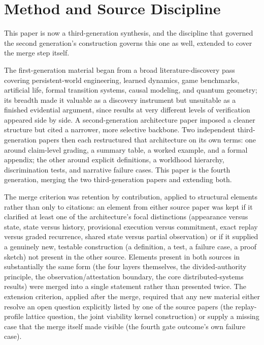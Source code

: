 \documentclass[11pt]{article}
\begin{document}
\section{Method and Source Discipline}
\label{sec:method}

This paper is now a third-generation synthesis, and the discipline that governed the second generation's construction governs this one as well, extended to cover the merge step itself.

The first-generation material began from a broad literature-discovery pass covering persistent-world engineering, learned dynamics, game benchmarks, artificial life, formal transition systems, causal modeling, and quantum geometry; its breadth made it valuable as a discovery instrument but unsuitable as a finished evidential argument, since results at very different levels of verification appeared side by side. A second-generation architecture paper imposed a cleaner structure but cited a narrower, more selective backbone. Two independent third-generation papers then each restructured that architecture on its own terms: one around claim-level grading, a summary table, a worked example, and a formal appendix; the other around explicit definitions, a worldhood hierarchy, discrimination tests, and narrative failure cases. This paper is the fourth generation, merging the two third-generation papers and extending both.

The merge criterion was retention by contribution, applied to structural elements rather than only to citations: an element from either source paper was kept if it clarified at least one of the architecture's focal distinctions (appearance versus state, state versus history, provisional execution versus commitment, exact replay versus graded recurrence, shared state versus partial observation) or if it supplied a genuinely new, testable construction (a definition, a test, a failure case, a proof sketch) not present in the other source. Elements present in both sources in substantially the same form (the four layers themselves, the divided-authority principle, the observation/attestation boundary, the core distributed-systems results) were merged into a single statement rather than presented twice. The extension criterion, applied after the merge, required that any new material either resolve an open question explicitly listed by one of the source papers (the replay-profile lattice question, the joint viability kernel construction) or supply a missing case that the merge itself made visible (the fourth gate outcome's own failure case).
\end{document}
